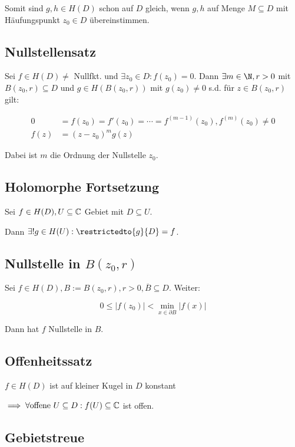 Somit sind $g, h \in H(D)$ schon auf $D$ gleich, wenn $g, h$ auf Menge $M \subseteq D$ mit Häufungspunkt $z_0 \in D$ übereinstimmen.

\subsection*{Nullstellensatz}

Sei $f \in H(D) \neq$ Nullfkt. und $\exists z_0 \in D : f(z_0) = 0$. Dann $\exists m \in \N, r > 0$ mit $B(z_0, r) \subseteq D$ und $g \in H(B(z_0,r))$ mit $g(z_0) \neq 0$ s.d. für $z \in B(z_0,r)$ gilt:

\vspace{-4mm}
\begin{align*}
0 &= f(z_0) = f'(z_0) = \cdots = f^{(m-1)}(z_0), f^{(m)}(z_0) \neq 0 \\
f(z) &= (z-z_0)^m g(z)
\end{align*}

Dabei ist $m$ die Ordnung der Nullstelle $z_0$.

\subsection*{Holomorphe Fortsetzung}

Sei $f \in H(D), U \subseteq \mathbb{C}$ Gebiet mit $D \subseteq U$.

Dann $\exists! g \in H(U) : \restrictedto{g}{D} = f$.

\subsection*{Nullstelle in $B(z_0,r)$}

Sei $f \in H(D), B := B(z_0,r), r > 0, \overline B \subseteq D$. Weiter:

\vspace*{-3mm}
$$0 \leq |f(z_0)| < \min_{x \in \partial B} |f(x)|$$

Dann hat $f$ Nullstelle in $B$.

\subsection*{Offenheitssatz}

$f \in H(D)$ ist auf kleiner Kugel in $D$ konstant

$\implies \forall \text{offene } U \subseteq D : f(U) \subseteq \mathbb{C}$ ist offen.

\subsection*{Gebietstreue}

